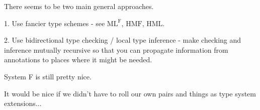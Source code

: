 \begin{frame}
  There seems to be two main general approaches.
\end{frame}

\begin{frame}
  1. Use fancier type schemes - see $\text{ML}^{\text{F}}$, $\text{HMF}$, $\text{HML}$.
\end{frame}

\begin{frame}
  2. Use bidirectional type checking / local type inference - make checking and
  inference mutually recursive so that you can propagate information from
  annotations to places where it might be needed.
\end{frame}

\begin{frame}
  System F is still pretty nice.
\end{frame}

\begin{frame}
  It would be nice if we didn't have to roll our own pairs and things as type
  system extensions...
\end{frame}

